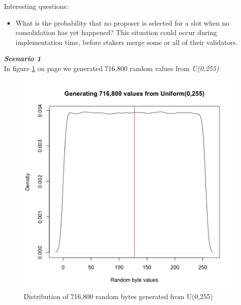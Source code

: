 Interesting questions:
\begin{itemize}
\item What is the probability that no proposer is selected for a slot when no consolidation has yet happened? This situation could occur during implementation time, before stakers merge some or all of their validators.
\end{itemize}


\noindent
\textbf{\textit{Scenario 1}} \\
\noindent
In figure \ref{fig:random} on page \pageref{fig:random} we generated 716,800 random values from \textit{U(0,255)} \\

\begin{figure}[htbp]
\begin{center}
\includegraphics[width=0.5\linewidth]{images/validator-indices-density}
\caption{Distribution of 716,800 random bytes generated from U(0,255)}
\label{fig:random}
\end{center}
\end{figure}


